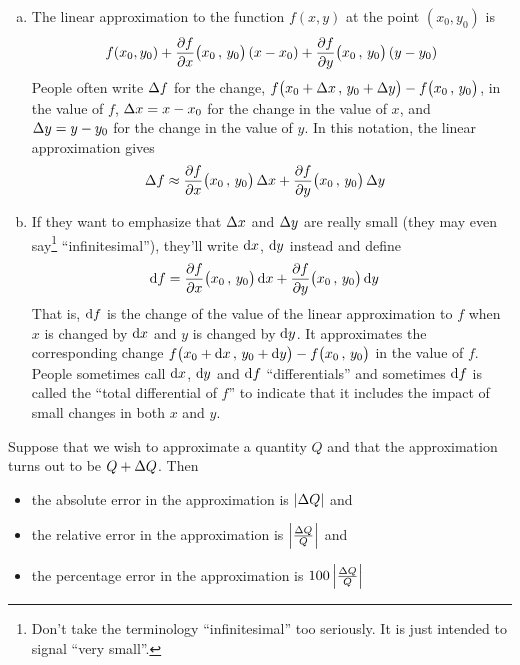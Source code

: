 \begin{defn}\label{def_differential}
\begin{enumerate}[(a)]
\item 
The linear approximation to the function $f(x,y)$ at the point $(x_0,y_0)$
is  
\begin{equation*}
f(x_0,y_0)
       + \pdiff{f}{x}\big(x_0\,,\,y_0\big)\,(x-x_0)
       + \pdiff{f}{y}\big(x_0\,,\,y_0\big)\,(y-y_0)
\end{equation*}
People often write $\Delta f$ for the change, 
$f\big(x_0+\Delta x\,,\,y_0+\Delta y\big) - f\big(x_0\,,\,y_0\big)$, 
in the value of $f$, 
$\Delta x=x-x_0$ for the change in the value of $x$, and 
$\Delta y=y-y_0$  for the change in the value of $y$.
In this notation, the linear approximation gives
\begin{align*}
\De f
&\approx  \pdiff{f}{x}\big(x_0\,,\,y_0\big)\,\De x
       + \pdiff{f}{y}\big(x_0\,,\,y_0\big)\,\De y
\end{align*}

\item
If they want to emphasize that $\Delta x$ and $\Delta y$
are really small (they may even say\footnote{Don't take the terminology ``infinitesimal'' too seriously. It is just intended to signal ``very small''.}  ``infinitesimal''), they'll write $\mathrm{d}x$, $\mathrm{d}y$ instead and define
\begin{align*}
\dee{f}
&=  \pdiff{f}{x}\big(x_0\,,\,y_0\big)\,\dee{x}
       + \pdiff{f}{y}\big(x_0\,,\,y_0\big)\,\dee{y}
\end{align*}
That is, $\mathrm{d}f$ is the change of the value of the linear approximation to 
$f$  when $x$ is changed by $\mathrm{d}x$ and $y$ is changed by $\mathrm{d}y$. It approximates the corresponding change  $f\big(x_0+\mathrm{d}x\,,\,y_0+\mathrm{d}y\big) - f\big(x_0\,,\,y_0\big)$ in the value of $f$.
People sometimes call $\mathrm{d}x$, $\mathrm{d}y$ and $\mathrm{d}f$ ``differentials'' and
sometimes $\mathrm{d}f$ is called the ``total differential of $f$'' to indicate that
it includes the impact of small changes in both $x$ and $y$.
\end{enumerate}
\end{defn}


\begin{defn}\label{def error}
Suppose that we wish to approximate a quantity $Q$ and that the
approximation turns out to be $Q+\Delta Q$. Then
\begin{itemize}\itemsep1pt \parskip0pt 
\item 
the absolute error in the approximation is $|\Delta Q|$ and
\item
the relative error in the approximation is $\left|\frac{\Delta Q}{Q}\right|$ and
\item
the percentage error in the approximation is
$100\left|\frac{\Delta Q}{Q}\right|$ 
\end{itemize}
\end{defn}

